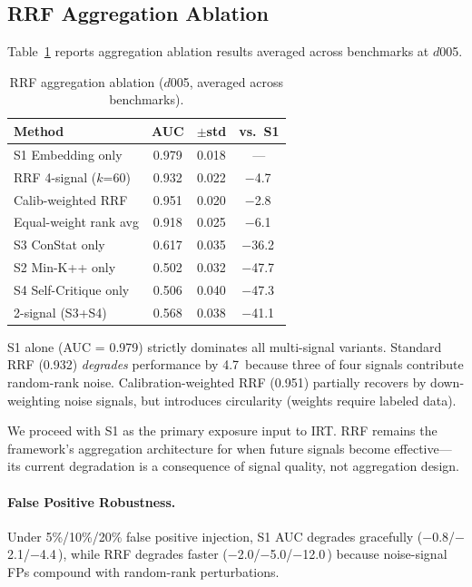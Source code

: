 \documentclass[11pt,a4paper]{article}
\newcommand{\pp}{\,\text{pp}}
\begin{document}
\subsection{RRF Aggregation Ablation}
\label{sec:rrf}

Table~\ref{tab:rrf} reports aggregation ablation results averaged across benchmarks at $d$005.

\begin{table}[t]
\centering
\small
\caption{RRF aggregation ablation ($d$005, averaged across benchmarks).}
\label{tab:rrf}
\begin{tabular}{@{}l cc c@{}}
\toprule
\textbf{Method} & \textbf{AUC} & \textbf{$\pm$std} & \textbf{vs.\ S1} \\
\midrule
S1 Embedding only & 0.979 & 0.018 & --- \\
RRF 4-signal ($k$=60) & 0.932 & 0.022 & $-$4.7\pp{} \\
Calib-weighted RRF & 0.951 & 0.020 & $-$2.8\pp{} \\
Equal-weight rank avg & 0.918 & 0.025 & $-$6.1\pp{} \\
S3 ConStat only & 0.617 & 0.035 & $-$36.2\pp{} \\
S2 Min-K++ only & 0.502 & 0.032 & $-$47.7\pp{} \\
S4 Self-Critique only & 0.506 & 0.040 & $-$47.3\pp{} \\
2-signal (S3+S4) & 0.568 & 0.038 & $-$41.1\pp{} \\
\bottomrule
\end{tabular}
\end{table}

S1 alone (AUC = 0.979) strictly dominates all multi-signal variants.
Standard RRF (0.932) \emph{degrades} performance by 4.7\pp{} because three of four signals contribute random-rank noise.
Calibration-weighted RRF (0.951) partially recovers by down-weighting noise signals, but introduces circularity (weights require labeled data).

We proceed with S1 as the primary exposure input to IRT.
RRF remains the framework's aggregation architecture for when future signals become effective---its current degradation is a consequence of signal quality, not aggregation design.

\paragraph{False Positive Robustness.}
Under 5\%/10\%/20\% false positive injection, S1 AUC degrades gracefully ($-$0.8/$-$2.1/$-$4.4\pp{}), while RRF degrades faster ($-$2.0/$-$5.0/$-$12.0\pp{}) because noise-signal FPs compound with random-rank perturbations.
\end{document}
